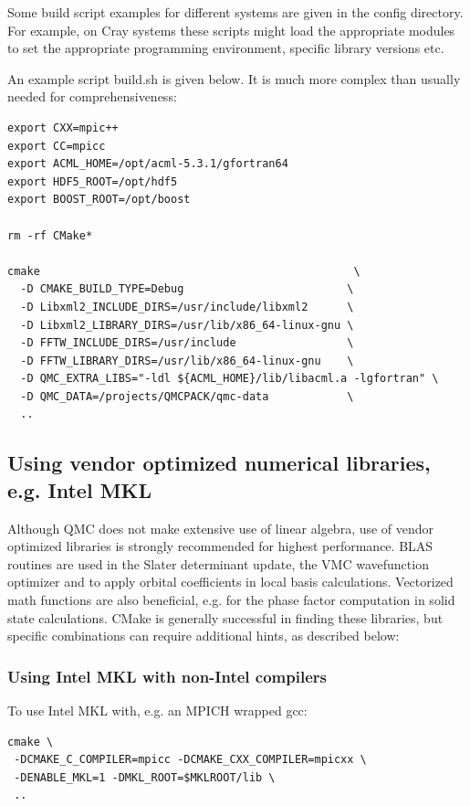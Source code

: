 Some build script examples for different systems are given in the
config directory. For example, on Cray systems these scripts might
load the appropriate modules to set the appropriate programming
environment, specific library versions etc.

An example script build.sh is given below. It is much more complex
than usually needed for comprehensiveness:

\verbatimfont{\footnotesize}
\begin{verbatim}
export CXX=mpic++
export CC=mpicc
export ACML_HOME=/opt/acml-5.3.1/gfortran64
export HDF5_ROOT=/opt/hdf5
export BOOST_ROOT=/opt/boost

rm -rf CMake*

cmake                                                \
  -D CMAKE_BUILD_TYPE=Debug                         \
  -D Libxml2_INCLUDE_DIRS=/usr/include/libxml2      \
  -D Libxml2_LIBRARY_DIRS=/usr/lib/x86_64-linux-gnu \
  -D FFTW_INCLUDE_DIRS=/usr/include                 \
  -D FFTW_LIBRARY_DIRS=/usr/lib/x86_64-linux-gnu    \
  -D QMC_EXTRA_LIBS="-ldl ${ACML_HOME}/lib/libacml.a -lgfortran" \
  -D QMC_DATA=/projects/QMCPACK/qmc-data            \
  ..
\end{verbatim}

\subsection{Using vendor optimized numerical libraries, e.g. Intel MKL}

Although QMC does not make extensive use of linear algebra, use of
vendor optimized libraries is strongly recommended for highest
performance. BLAS routines are used in the Slater determinant update, the VMC wavefunction optimizer
and to apply orbital coefficients in local basis calculations. Vectorized
math functions are also beneficial, e.g. for the phase factor
computation in solid state calculations. CMake is generally successful
in finding these libraries, but specific combinations can require
additional hints, as described below:

\subsubsection{Using Intel MKL with non-Intel compilers}

To use Intel MKL with, e.g. an MPICH wrapped gcc:
\verbatimfont{\footnotesize}
\begin{verbatim}
cmake \
 -DCMAKE_C_COMPILER=mpicc -DCMAKE_CXX_COMPILER=mpicxx \
 -DENABLE_MKL=1 -DMKL_ROOT=$MKLROOT/lib \
 ..
\end{verbatim}

